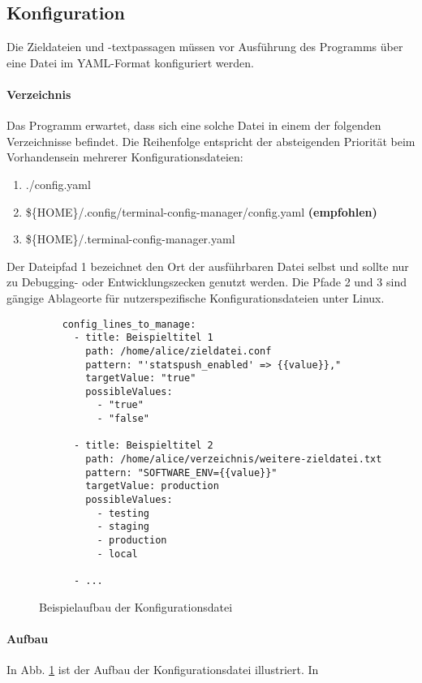 \subsection{Konfiguration}
Die Zieldateien und -textpassagen müssen vor Ausführung des Programms
über eine Datei im YAML-Format konfiguriert werden.

\paragraph{Verzeichnis}
Das Programm erwartet, dass sich eine solche Datei in einem der folgenden
Verzeichnisse befindet. Die Reihenfolge entspricht der absteigenden Priorität
beim Vorhandensein mehrerer Konfigurationsdateien:

\begin{enumerate}
  \item ./config.yaml
  \item \$\{HOME\}/.config/terminal-config-manager/config.yaml \textbf{(empfohlen)}
  \item \$\{HOME\}/.terminal-config-manager.yaml
\end{enumerate}

Der Dateipfad 1 bezeichnet den Ort der ausführbaren Datei selbst und sollte nur
zu Debugging- oder Entwicklungszecken genutzt werden. Die Pfade 2 und 3 sind
gängige Ablageorte für nutzerspezifische Konfigurationsdateien unter Linux.

\newenvironment{code}{\captionsetup{type=listing}}{}

\begin{figure}
  \caption{Beispielaufbau der Konfigurationsdatei}
  \label{fig:sample-config}
  \begin{verbatim}
    config_lines_to_manage:
      - title: Beispieltitel 1
        path: /home/alice/zieldatei.conf
        pattern: "'statspush_enabled' => {{value}},"
        targetValue: "true"
        possibleValues:
          - "true"
          - "false"

      - title: Beispieltitel 2
        path: /home/alice/verzeichnis/weitere-zieldatei.txt
        pattern: "SOFTWARE_ENV={{value}}"
        targetValue: production
        possibleValues:
          - testing
          - staging
          - production
          - local

      - ...
  \end{verbatim}
\end{figure}

\paragraph{Aufbau}
In Abb. \ref{fig:sample-config} ist der Aufbau der Konfigurationsdatei
illustriert. In \cite{latex2e}
